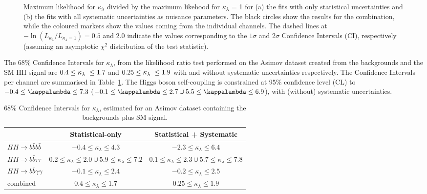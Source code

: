 \begin{figure}[!htb]
\centering 
{} 
\caption{Maximum likelihood for $\kappa_{\lambda}$ divided by the maximum likehood for $\kappa_{\lambda}$ = 1 for (a) the fits with only statistical uncertainties and (b) the fits with all systematic uncertainties as nuisance parameters. The black circles show the results for the combination, while the coloured markers show the values coming from the individual channels. The dashed lines at $-\ln\left(L_{\kappa_{\lambda}}/L_{\kappa_{\lambda}=1}\right) = 0.5$ and 2.0 indicate the values corresponding to the $1\sigma$ and $2\sigma$ Confidence Intervals (CI), respectively (assuming an asymptotic $\chi^2$ distribution of the test statistic).} 
\label{fig:ATLAS_HH_comb} 
\end{figure}

The 68\% Confidence Intervals for $\kappa_{\lambda}$, from the likelihood ratio test performed on the Asimov dataset created from the backgrounds and the SM HH signal are $0.4 \leq \kappa_{\lambda}\ \leq 1.7$ and $0.25 \leq \kappa_{\lambda}\ \leq 1.9$ with and without systematic uncertainties respectively. The Confidence Intervals per channel are summarised in Table~\ref{tab:ATLAS_HH_kappalambda}. 
The Higgs boson self-coupling is constrained at 95\% confidence level (CL) to $-0.4\leq\kappalambda\leq7.3$ ($-0.1\leq\kappalambda\leq2.7\cup5.5\leq\kappalambda\leq6.9$), with (without) systematic uncertainties.


\begin{table}[htb!]
\begin{center}
\begin{tabular}{lcc} \toprule
 & \textbf{Statistical-only} & \textbf{Statistical + Systematic}\\
\hline
$HH \rightarrow b\bar{b}b\bar{b}$ & $-0.4 \leq \kappa_{\lambda} \leq 4.3$ & $-2.3 \leq \kappa_{\lambda} \leq 6.4$ \\
$HH \rightarrow b\bar{b}\tau\tau$ &  $0.2 \leq \kappa_{\lambda} \leq 2.0 \cup 5.9 \leq \kappa_{\lambda} \leq 7.2$ & $0.1 \leq \kappa_{\lambda} \leq 2.3 \cup 5.7 \leq \kappa_{\lambda} \leq 7.8$ \\
$HH \rightarrow b\bar{b}\gamma\gamma$ &  $-0.1 \leq \kappa_{\lambda} \leq 2.4$ & $-0.2 \leq \kappa_{\lambda} \leq 2.5$ \\
combined &   $0.4 \leq \kappa_{\lambda} \leq 1.7$ & $0.25 \leq \kappa_{\lambda} \leq 1.9$ \\
\bottomrule
\end{tabular}
\end{center}
\caption{68\% Confidence Intervals for $\kappa_{\lambda}$, estimated for an Asimov dataset containing the backgrounds plus SM signal.}
\label{tab:ATLAS_HH_kappalambda}
\end{table}



